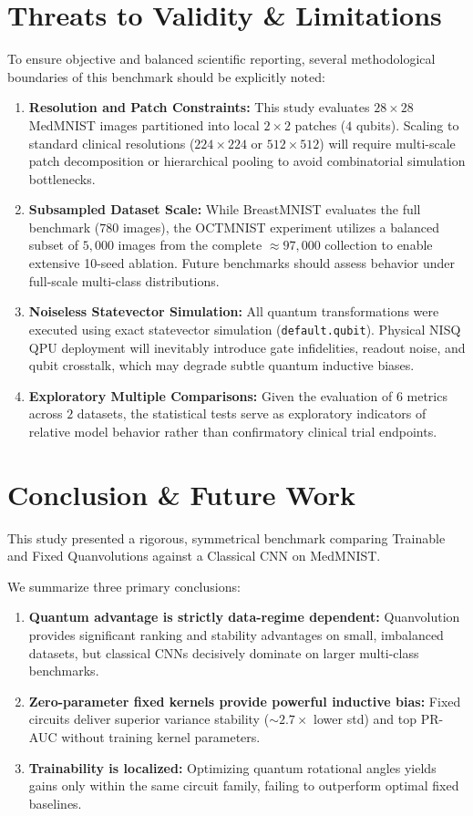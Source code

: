 \documentclass[journal]{IEEEtran}
\begin{document}
\section{Threats to Validity \& Limitations}
To ensure objective and balanced scientific reporting, several methodological boundaries of this benchmark should be explicitly noted:
\begin{enumerate}
    \item \textbf{Resolution and Patch Constraints:} This study evaluates $28 \times 28$ MedMNIST images partitioned into local $2 \times 2$ patches ($4$ qubits). Scaling to standard clinical resolutions ($224 \times 224$ or $512 \times 512$) will require multi-scale patch decomposition or hierarchical pooling to avoid combinatorial simulation bottlenecks.
    \item \textbf{Subsampled Dataset Scale:} While BreastMNIST evaluates the full benchmark ($780$ images), the OCTMNIST experiment utilizes a balanced subset of $5{,}000$ images from the complete $\approx 97{,}000$ collection to enable extensive 10-seed ablation. Future benchmarks should assess behavior under full-scale multi-class distributions.
    \item \textbf{Noiseless Statevector Simulation:} All quantum transformations were executed using exact statevector simulation (\texttt{default.qubit}). Physical NISQ QPU deployment will inevitably introduce gate infidelities, readout noise, and qubit crosstalk, which may degrade subtle quantum inductive biases.
    \item \textbf{Exploratory Multiple Comparisons:} Given the evaluation of $6$ metrics across $2$ datasets, the statistical tests serve as exploratory indicators of relative model behavior rather than confirmatory clinical trial endpoints.
\end{enumerate}

\section{Conclusion \& Future Work}
This study presented a rigorous, symmetrical benchmark comparing Trainable and Fixed Quanvolutions against a Classical CNN on MedMNIST.

We summarize three primary conclusions:
\begin{enumerate}
    \item \textbf{Quantum advantage is strictly data-regime dependent:} Quanvolution provides significant ranking and stability advantages on small, imbalanced datasets, but classical CNNs decisively dominate on larger multi-class benchmarks.
    \item \textbf{Zero-parameter fixed kernels provide powerful inductive bias:} Fixed circuits deliver superior variance stability ($\sim 2.7\times$ lower std) and top PR-AUC without training kernel parameters.
    \item \textbf{Trainability is localized:} Optimizing quantum rotational angles yields gains only within the same circuit family, failing to outperform optimal fixed baselines.
\end{enumerate}
\end{document}
